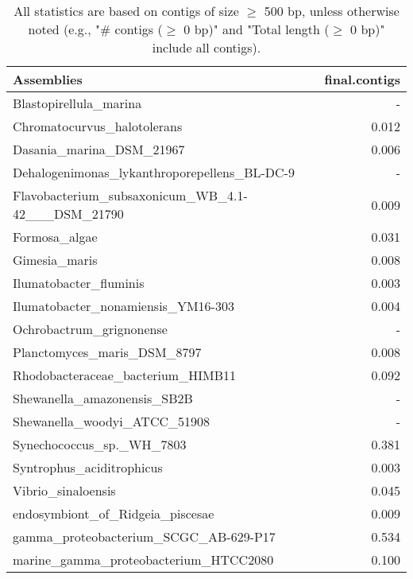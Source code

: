 \documentclass[12pt,a4paper]{article}
\begin{document}
\begin{table}[ht]
\begin{center}
\caption{All statistics are based on contigs of size $\geq$ 500 bp, unless otherwise noted (e.g., "\# contigs ($\geq$ 0 bp)" and "Total length ($\geq$ 0 bp)" include all contigs).}
\begin{tabular}{|l*{1}{|r}|}
\hline
Assemblies & final.contigs \\ \hline
Blastopirellula\_marina & - \\ \hline
Chromatocurvus\_halotolerans & 0.012 \\ \hline
Dasania\_marina\_DSM\_21967 & 0.006 \\ \hline
Dehalogenimonas\_lykanthroporepellens\_BL-DC-9 & - \\ \hline
Flavobacterium\_subsaxonicum\_WB\_4.1-42\_\_\_DSM\_21790 & 0.009 \\ \hline
Formosa\_algae & 0.031 \\ \hline
Gimesia\_maris & 0.008 \\ \hline
Ilumatobacter\_fluminis & 0.003 \\ \hline
Ilumatobacter\_nonamiensis\_YM16-303 & 0.004 \\ \hline
Ochrobactrum\_grignonense & - \\ \hline
Planctomyces\_maris\_DSM\_8797 & 0.008 \\ \hline
Rhodobacteraceae\_bacterium\_HIMB11 & 0.092 \\ \hline
Shewanella\_amazonensis\_SB2B & - \\ \hline
Shewanella\_woodyi\_ATCC\_51908 & - \\ \hline
Synechococcus\_sp.\_WH\_7803 & 0.381 \\ \hline
Syntrophus\_aciditrophicus & 0.003 \\ \hline
Vibrio\_sinaloensis & 0.045 \\ \hline
endosymbiont\_of\_Ridgeia\_piscesae & 0.009 \\ \hline
gamma\_proteobacterium\_SCGC\_AB-629-P17 & 0.534 \\ \hline
marine\_gamma\_proteobacterium\_HTCC2080 & 0.100 \\ \hline
\end{tabular}
\end{center}
\end{table}
\end{document}
